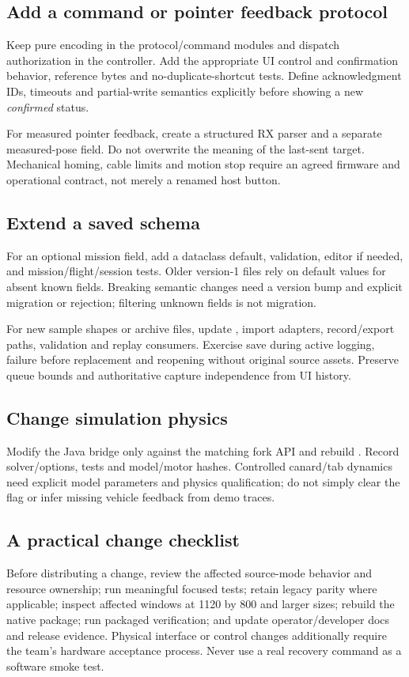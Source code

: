 \subsection{Add a command or pointer feedback protocol}
Keep pure encoding in the protocol/command modules and dispatch authorization in
the controller. Add the appropriate UI control and confirmation behavior,
reference bytes and no-duplicate-shortcut tests. Define acknowledgment IDs,
timeouts and partial-write semantics explicitly before showing a new
\emph{confirmed} status.

For measured pointer feedback, create a structured RX parser and a separate
measured-pose field. Do not overwrite the meaning of the last-sent target.
Mechanical homing, cable limits and motion stop require an agreed firmware and
operational contract, not merely a renamed host button.

\subsection{Extend a saved schema}
For an optional mission field, add a dataclass default, validation, editor if
needed, and mission/flight/session tests. Older version-1 files rely on default
values for absent known fields. Breaking semantic changes need a version bump
and explicit migration or rejection; filtering unknown fields is not migration.

For new sample shapes or archive files, update , import adapters,
record/export paths,  validation and replay consumers.
Exercise save during active logging, failure before replacement and reopening
without original source assets. Preserve queue bounds and authoritative capture
independence from UI history.

\subsection{Change simulation physics}
Modify the Java bridge only against the matching fork API and rebuild
. Record solver/options, tests and model/motor hashes.
Controlled canard/tab dynamics need explicit model parameters and physics
qualification; do not simply clear the 
flag or infer missing vehicle feedback from demo traces.

\subsection{A practical change checklist}
Before distributing a change, review the affected source-mode behavior and
resource ownership; run meaningful focused tests; retain legacy parity where
applicable; inspect affected windows at 1120 by 800 and larger sizes; rebuild the
native package; run packaged verification; and update operator/developer docs
and release evidence. Physical interface or control changes additionally require
the team's hardware acceptance process. Never use a real recovery command as a
software smoke test.
